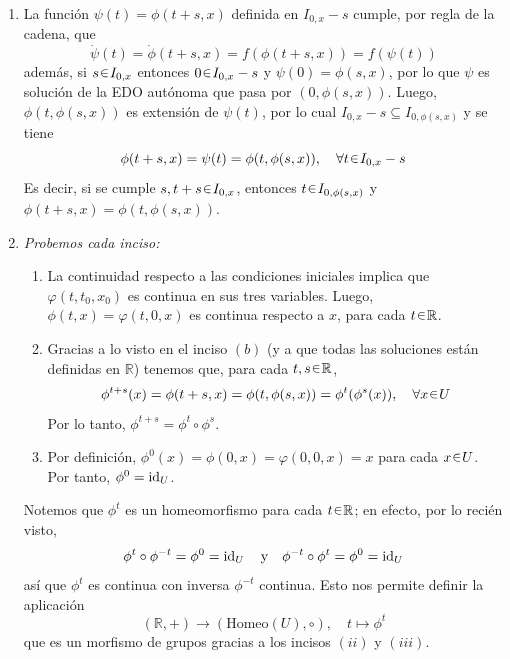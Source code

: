 \begin{sol}
\begin{enumerate}[label = (\alph*)]
\item La función $\psi(t) = \phi(t+s,x)$ definida en $I_{0,x}-s$ cumple, por regla de la cadena, que
\[
\dot\psi(t) = \dot\phi(t+s,x) = f(\phi(t+s,x)) = f(\psi(t))
\]
además, si $s \en I_{0,x}$ entonces $0 \en {I_{0,x} - s}$ y $\psi(0) = \phi(s,x)$, por lo que $\psi$ es solución de la EDO autónoma que pasa por $(0,\phi(s,x))$. Luego, $\phi(t,\phi(s,x))$ es extensión de $\psi(t)$, por lo cual $I_{0,x}-s \subseteq I_{0,\phi(s,x)}$ y se tiene
\[
\phi(t+s,x) = \psi(t) = \phi(t, \phi(s,x)),%
\quad\forall t \en I_{0,x}-s
\]
Es decir, si se cumple $s,t + s \en I_{0,x}$, entonces $t \en I_{0,\phi(s,x)}$ y $\phi(t+s,x) = \phi(t,\phi(s,x))$.
\clearpage
\item \emph{Probemos cada inciso:}
    \begin{enumerate}[label = \roman*.]
    \item La continuidad respecto a las condiciones iniciales implica que $\varphi(t,t_0,x_0)$ es continua en sus tres variables. Luego, $\phi(t,x) = \varphi(t,0,x)$ es continua respecto a $x$, para cada $t \en \mathbb{R}$.

    \item Gracias a lo visto en el inciso $(b)$ (y a que todas las soluciones están definidas en $\mathbb{R}$) tenemos que, para cada $t,s \en \mathbb{R}$,
    \[
    \phi^{t+s}(x) = \phi(t+s,x) = \phi(t,\phi(s,x)) = \phi^t(\phi^s(x)),%
    \quad\forall x \en U
    \]
    Por lo tanto, $\phi^{t+s} = \phi^t \circ \phi^s$.

    \item Por definición, $\phi^0(x) = \phi(0,x) = \varphi(0,0,x) = x$ para cada $x \en U$. Por tanto, $\phi^0 = \operatorname{id}_U$.
    \end{enumerate}
Notemos que $\phi^t$ es un homeomorfismo para cada $t \en \mathbb{R}$; en efecto, por lo recién visto,
\[
\phi^t \circ \phi^{-t} = 
\phi^0 = \id_U%
\quad\text{y}\quad
\phi^{-t} \circ \phi^t = \phi^0 = \id_U
\]
así que $\phi^t$ es continua con inversa $\phi^{-t}$ continua. Esto nos permite definir la aplicación
\[
(\mathbb{R}, +) \to (\mathrm{Homeo}(U), \circ),%
\quad%
t \mapsto \phi^t
\]
que es un morfismo de grupos gracias a los incisos $(ii)$ y $(iii)$.
\end{enumerate}
\end{sol}

